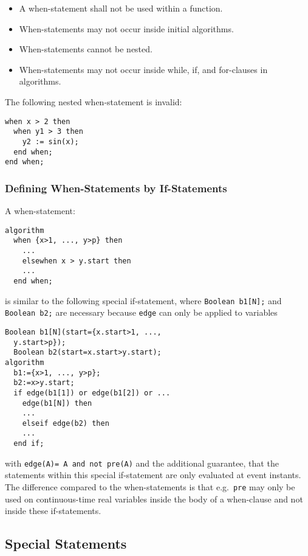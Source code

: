 \begin{itemize}
\item
  A when-statement shall not be used within a function.
\item
  When-statements may not occur inside initial algorithms.
\item
  When-statements cannot be nested.
\item
  When-statements may not occur inside while, if, and for-clauses in
  algorithms.
\end{itemize}

\begin{example}
The following nested when-statement is invalid:
\begin{lstlisting}[language=modelica]
when x > 2 then
  when y1 > 3 then
    y2 := sin(x);
  end when;
end when;
\end{lstlisting}
\end{example}

\subsubsection{Defining When-Statements by If-Statements}\label{defining-when-statements-by-if-statements}

A when-statement:
\begin{lstlisting}[language=modelica]
algorithm
  when {x>1, ..., y>p} then
    ...
    elsewhen x > y.start then
    ...
  end when;
\end{lstlisting}
is similar to the following special if-statement, where \lstinline!Boolean b1[N];! and \lstinline!Boolean b2;! are necessary because \lstinline!edge! can
only be applied to variables
\begin{lstlisting}[language=modelica]
  Boolean b1[N](start={x.start>1, ...,
  y.start>p});
  Boolean b2(start=x.start>y.start);
algorithm
  b1:={x>1, ..., y>p};
  b2:=x>y.start;
  if edge(b1[1]) or edge(b1[2]) or ...
    edge(b1[N]) then
    ...
    elseif edge(b2) then
    ...
  end if;
\end{lstlisting}
with \lstinline!edge(A)= A and not pre(A)! and the additional guarantee, that the
statements within this special if-statement are only evaluated at event
instants. The difference compared to the when-statements is that e.g.\ \lstinline!pre! may only be used on continuous-time real variables inside the body
of a when-clause and not inside these if-statements.

\subsection{Special Statements}\label{special-statements}

